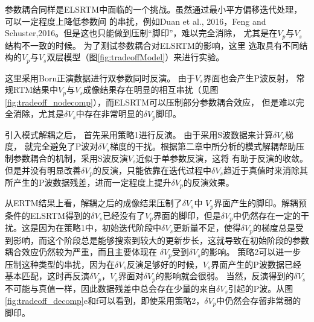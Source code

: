 参数耦合同样是ELSRTM中面临的一个挑战。虽然通过最小平方偏移迭代处理，可以一定程度上降低参数间
的串扰，例如Duan et al., 2016\cite{Duan2016}，Feng and
Schuster,2016\cite{Feng2016}。但是这也只能做到压制“脚印”，难以完全消除，
尤其是在$V_p$与$V_s$结构不一致的时候。%
为了测试参数耦合对ELSRTM的影响，这里
选取具有不同结构的$V_p$与$V_s$双层模型（图\ref{fig:tradeoffModel}）来进行实验。

这里采用Born正演数据进行双参数同时反演。
由于$V_s$界面也会产生P波反射，
常规RTM结果中$V_p$与$V_s$成像结果存在明显的相互串扰（见图\ref{fig:tradeoff_nodecomp}），而ELSRTM可以压制部分参数耦合效应，
但是难以完全消除，尤其是$\delta V_s$中存在非常明显的$\delta V_p$脚印。

引入模式解耦之后，
首先采用策略1进行反演。
由于采用S波数据来计算$\delta V_s$梯度，
就完全避免了P波对$\delta
V_s$梯度的干扰。根据第二章中所分析的模式解耦帮助压制参数耦合的机制，采用S波反演$V_s$近似于单参数反演，这将
有助于反演的收敛。但是并没有明显改善$\delta
V_p$的反演，只能依靠在迭代过程中$\delta
V_s$趋近于真值时来消除其所产生的P波数据残差，进而一定程度上提升$\delta V_p$的反演效果。

从ERTM结果上看，解耦之后的成像结果压制了$\delta V_s$中
$V_p$界面产生的脚印。解耦预条件的ELSRTM得到的$\delta
V_s$已经没有了$V_p$界面的脚印，但是$\delta
V_p$中仍然存在一定的干扰。这是因为在策略1中，初始迭代阶段中$\delta
V_s$更新量不足，使得$\delta
V_p$的梯度总是受到影响，而这个阶段总是能够搜索到较大的更新步长，这就导致在初始阶段的参数耦合效应仍然较为严重，而且主要体现在
$\delta V_p$受到$\delta V_s$的影响。
策略2可以进一步压制这种类型的串扰，因为在$\delta
V_s$反演足够好的时候，$V_s$界面产生的P波数据已经基本匹配，这时再反演$\delta
V_p$，$V_s$界面对$\delta V_p$的影响就会很弱。
当然，反演得到的$\delta V_s$不可能与真值一样，因此数据残差中总会存在少量的来自$\delta
V_s$引起的P波。从图\ref{fig:tradeoff_decomp}e和f可以看到，即使采用策略2，$\delta V_p$中仍然会存留非常弱的脚印。


